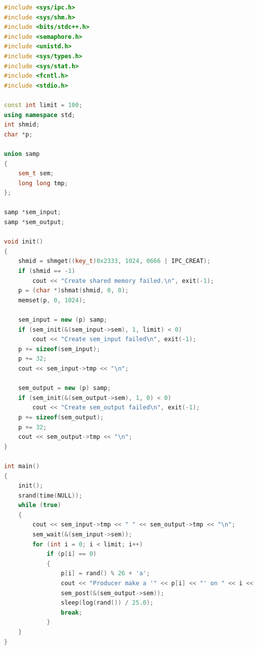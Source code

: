\documentclass[UTF8]{ctexart}
\begin{document}
\begin{lstlisting}[language=c++, name=os6_producer.cpp]
#include <sys/ipc.h>
#include <sys/shm.h>
#include <bits/stdc++.h>
#include <semaphore.h>
#include <unistd.h>
#include <sys/types.h>
#include <sys/stat.h>
#include <fcntl.h>
#include <stdio.h>

const int limit = 100;
using namespace std;
int shmid;
char *p;

union samp
{
    sem_t sem;
    long long tmp;
};

samp *sem_input;
samp *sem_output;

void init()
{
    shmid = shmget((key_t)0x2333, 1024, 0666 | IPC_CREAT);
    if (shmid == -1)
        cout << "Create shared memory failed.\n", exit(-1);
    p = (char *)shmat(shmid, 0, 0);
    memset(p, 0, 1024);

    sem_input = new (p) samp;
    if (sem_init(&(sem_input->sem), 1, limit) < 0)
        cout << "Create sem_input failed\n", exit(-1);
    p += sizeof(sem_input);
    p += 32;
    cout << sem_input->tmp << "\n";

    sem_output = new (p) samp;
    if (sem_init(&(sem_output->sem), 1, 0) < 0)
        cout << "Create sem_output failed\n", exit(-1);
    p += sizeof(sem_output);
    p += 32;
    cout << sem_output->tmp << "\n";
}

int main()
{
    init();
    srand(time(NULL));
    while (true)
    {
        cout << sem_input->tmp << " " << sem_output->tmp << "\n";
        sem_wait(&(sem_input->sem));
        for (int i = 0; i < limit; i++)
            if (p[i] == 0)
            {
                p[i] = rand() % 26 + 'a';
                cout << "Producer make a '" << p[i] << "' on " << i << ".\n";
                sem_post(&(sem_output->sem));
                sleep(log(rand()) / 25.0);
                break;
            }
    }
}
\end{lstlisting}
\end{document}
